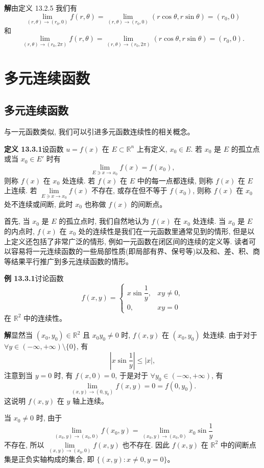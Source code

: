 \documentclass[UTF8, 12pt, fontset=fandol, oneside]{ctexart}
\begin{document}
\noindent\textbf{解}\quad 由定义 13.2.5 我们有
\[
  \lim_{(r,\theta)\to(r_0,0)}f(r,\theta)
  =\lim_{(r,\theta)\to(r_0,0)}(r\cos\theta,r\sin\theta)=(r_0,0)
\]
和
\[
  \lim_{(r,\theta)\to(r_0,2\pi)}f(r,\theta)
  =\lim_{(r,\theta)\to(r_0,2\pi)}(r\cos\theta,r\sin\theta)=(r_0,0).
\]

\section{多元连续函数}

\subsection{多元连续函数}

与一元函数类似, 我们可以引进多元函数连续性的相关概念。

\noindent\textbf{定义 13.3.1}\quad 设函数 $u=f(x)$ 在 $E\subset\mathbb R^n$ 上有定义, $x_0\in E$. 若 $x_0$ 是 $E$ 的孤立点或当 $x_0\in E'$ 时有
\[
  \lim_{E\ni x\to x_0}f(x)=f(x_0),
\]
则称 $f(x)$ 在 $x_0$ 处连续. 若 $f(x)$ 在 $E$ 中的每一点都连续, 则称 $f(x)$ 在 $E$ 上连续. 若 $\lim\limits_{E\ni x\to x_0}f(x)$ 不存在, 或存在但不等于 $f(x_0)$, 则称 $f(x)$ 在 $x_0$ 处不连续或间断, 此时 $x_0$ 也称做 $f(x)$ 的间断点。

首先, 当 $x_0$ 是 $E$ 的孤立点时, 我们自然地认为 $f(x)$ 在 $x_0$ 处连续. 当 $x_0$ 是 $E$ 的内点时, $f(x)$ 在 $x_0$ 处的连续性是我们在一元函数里通常见到的情形, 但是以上定义还包括了非常广泛的情形, 例如一元函数在闭区间的连续的定义等. 读者可以容易将一元连续函数的一些局部性质(即局部有界、保号等)以及和、差、积、商等结果平行推广到多元连续函数的情形。

\noindent\textbf{例 13.3.1}\quad 讨论函数
\[
  f(x,y)=
  \begin{cases}
    x\sin\dfrac1y, & xy\ne0,\\
    0, & xy=0
  \end{cases}
\]
在 $\mathbb R^2$ 中的连续性。

\noindent\textbf{解}\quad 显然当 $(x_0,y_0)\in\mathbb R^2$ 且 $x_0y_0\ne0$ 时, $f(x,y)$ 在 $(x_0,y_0)$ 处连续. 由于对于 $\forall y\in(-\infty,+\infty)\setminus\{0\}$, 有
\[
  \left|x\sin\frac1y\right|\le |x|,
\]
注意到当 $y=0$ 时, 有 $f(x,0)=0$, 于是对于 $\forall y_0\in(-\infty,+\infty)$, 有
\[
  \lim_{(x,y)\to(0,y_0)}f(x,y)=0=f(0,y_0).
\]
这说明 $f(x,y)$ 在 $y$ 轴上连续。

当 $x_0\ne0$ 时, 由于
\[
  \lim_{(x_0,y)\to(x_0,0)}f(x_0,y)
  =\lim_{(x_0,y)\to(x_0,0)}x_0\sin\frac1y
\]
不存在, 所以 $\lim\limits_{(x,y)\to(x_0,0)}f(x,y)$ 也不存在. 因此 $f(x,y)$ 在 $\mathbb R^2$ 中的间断点集是正负实轴构成的集合, 即 $\{(x,y):x\ne0,y=0\}$。
\end{document}
